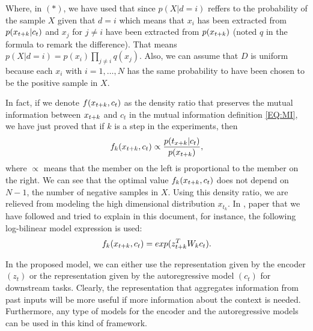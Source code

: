 Where, in $\left(\ast\right)$, we have used that since $p(X|d=i)$ reffers to the probability of the sample $X$ given that $d = i$ which means that $x_i$ has been extracted from $p(x_{t+k}|c_t)$ and 
$x_j$ for $j \neq i$ have been extracted from $p(x_{t+k})$ (noted $q$ in the formula to remark the difference). That means $p(X|d=i) = p(x_i)\prod_{j\neq i} q(x_j)$. Also, we can assume that $D$ is uniform because each $x_i$ with $i = 1,\dots,N$ 
has the same probability to have been chosen to be the positive sample in $X$.


In fact, if we denote $f(x_{t+k},c_t)$  as the density ratio that preserves the mutual information between $x_{t+k}$ and $c_t$ in the mutual information definition \eqref{EQ:MI}, we have just proved that if $k$ is a step in the experiments, then
\begin{equation}\label{EQ:Proportional}
f_k(x_{t+k},c_t)  \propto \frac{p(t_{x+k}| c_t)}{p(x_{t+k})},
\end{equation}
where $\propto$ means that the member on the left is proportional to the member on the right. We can see that the optimal value $f_k(x_{t+k},c_t)$ does not depend on $N-1$, the number of negative samples in $X$.
Using this density ratio, we are relieved from modeling the high dimensional distribution $x_{t_k}$. In \citep{oord_representation_2019}, paper that we have followed and tried to explain in this document, for instance, the following log-bilinear model expression is used:
$$
f_k(x_{t+k},c_t) = exp(z_{t+k}^T W_k c_t).
$$


In the proposed model, we can either use the representation given by the encoder $(z_t)$ or the representation given by the autoregressive model $(c_t)$ for downstream tasks. Clearly, the representation that aggregates information from past inputs will be more useful
if more information about the context is needed. Furthermore, any type of models for the encoder and the autoregressive models can be used in this kind of framework.

